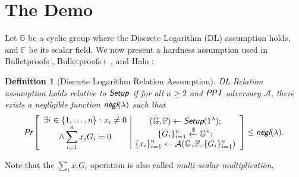 \documentclass{article}
\newtheorem{definition}{Definition}[section]
\begin{document}
\section{The Demo}
Let $\mathbb{G}$ be a cyclic group where the Discrete Logarithm (DL) assumption holds, and $\mathbb{F}$ be its scalar field. We now present a hardness assumption used in Bulletproofs \cite{bp}, Bulletproofs+ \cite{bp-plus}, and Halo \cite{halo}:

\begin{definition}[Discrete Logarithm Relation Assumption]
	DL Relation assumption holds relative to $\emph{\textsf{Setup}}$ if for all $n \ge 2$ and  $\emph{\textsf{PPT}}$ adversary $\mathcal{A}$, there exists a negligible function $\emph{\textsf{negl}}(\lambda)$ such that
	\begin{align*}
		\emph{\textsf{Pr}}\left[
		\begin{array}{c|c}
			\begin{gathered}
				\exists i \in \{1, \ldots, n\}: x_i \ne 0 \\
				\wedge \sum_{i=1}^{n} x_i G_i = 0
			\end{gathered}
			&
			\begin{gathered}
				(\mathbb{G}, \mathbb{F})\leftarrow\emph{\textsf{Setup}}(1^{\lambda}); \\
				\{G_i\}_{i=1}^n \xleftarrow{\$}\mathbb{G}^n; \\
				\{x_i\}_{i=1}^n \leftarrow\mathcal{A}(\mathbb{G}, \mathbb{F}, \{G_i\}_{i=1}^n) \\
			\end{gathered}
		\end{array}
		\right]
		\le \emph{\textsf{negl}}(\lambda).
	\end{align*}
\end{definition}
\noindent Note that the $\sum_i x_i G_i$ operation is also called \textit{multi-scalar multiplication}.
\end{document}

